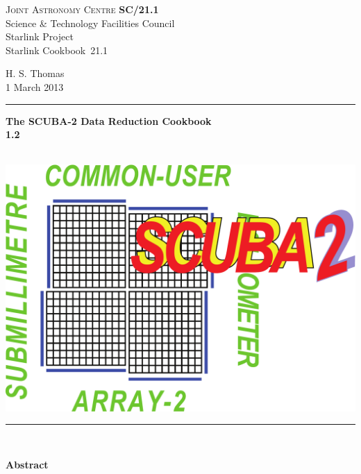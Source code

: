 \documentclass[twoside,11pt]{article}
\newcommand{\stardoccategory} {Starlink Cookbook}
\newcommand{\stardocinitials} {SC}
\newcommand{\stardocnumber} {21.1}
\newcommand{\stardocauthors} {H. S. Thomas}
\newcommand{\stardocdate} {1 March 2013}
\newcommand{\stardoctitle} {The SCUBA-2 Data Reduction Cookbook}
\newcommand{\stardocversion} {1.2}
\newcommand{\stardocmanual} {\ }
\newcommand{\stardocname}{\stardocinitials /\stardocnumber}
\newenvironment{latexonly}{}{}
\renewcommand{\_}{\texttt{\symbol{95}}}
\begin{document}
\thispagestyle{empty}

\begin{latexonly}
   \textsc{Joint Astronomy Centre} \hfill \textbf{\stardocname}\\
   {\large Science \& Technology Facilities Council}\\
   {\large Starlink Project\\}
   {\large \stardoccategory\ \stardocnumber}
   \begin{flushright}
   \stardocauthors\\
   \stardocdate
   \end{flushright}
   \vspace{-4mm}
   \rule{\textwidth}{0.5mm}
   \vspace{5mm}
   \begin{center}
   {\Huge\textbf{\stardoctitle \\ [2.5ex]}}
   {\LARGE\textbf{\stardocversion \\ [4ex]}}
   {\Huge\textbf{\stardocmanual}}
   \end{center}
   \vspace{5mm}

   \begin{center}
   \includegraphics[scale=0.4]{sc21_s2logo}
   \end{center}
   \vspace{5mm}
   \rule{\textwidth}{0.5mm}\\
   \vspace{15mm}

   \vspace{10mm}
   \begin{center}
      {\Large\textbf{Abstract}}
   \end{center}
\end{latexonly}
\end{document}
